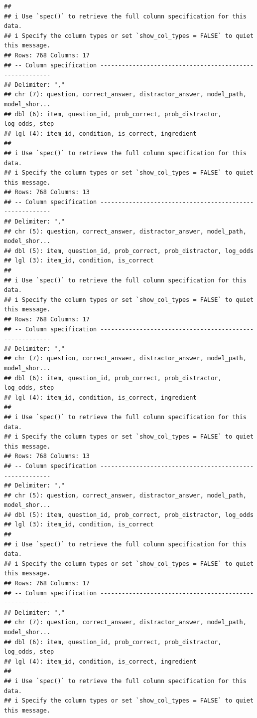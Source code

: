 \documentclass[
]{article}
\begin{document}
\begin{verbatim}
## 
## i Use `spec()` to retrieve the full column specification for this data.
## i Specify the column types or set `show_col_types = FALSE` to quiet this message.
## Rows: 768 Columns: 17
## -- Column specification --------------------------------------------------------
## Delimiter: ","
## chr (7): question, correct_answer, distractor_answer, model_path, model_shor...
## dbl (6): item, question_id, prob_correct, prob_distractor, log_odds, step
## lgl (4): item_id, condition, is_correct, ingredient
## 
## i Use `spec()` to retrieve the full column specification for this data.
## i Specify the column types or set `show_col_types = FALSE` to quiet this message.
## Rows: 768 Columns: 13
## -- Column specification --------------------------------------------------------
## Delimiter: ","
## chr (5): question, correct_answer, distractor_answer, model_path, model_shor...
## dbl (5): item, question_id, prob_correct, prob_distractor, log_odds
## lgl (3): item_id, condition, is_correct
## 
## i Use `spec()` to retrieve the full column specification for this data.
## i Specify the column types or set `show_col_types = FALSE` to quiet this message.
## Rows: 768 Columns: 17
## -- Column specification --------------------------------------------------------
## Delimiter: ","
## chr (7): question, correct_answer, distractor_answer, model_path, model_shor...
## dbl (6): item, question_id, prob_correct, prob_distractor, log_odds, step
## lgl (4): item_id, condition, is_correct, ingredient
## 
## i Use `spec()` to retrieve the full column specification for this data.
## i Specify the column types or set `show_col_types = FALSE` to quiet this message.
## Rows: 768 Columns: 13
## -- Column specification --------------------------------------------------------
## Delimiter: ","
## chr (5): question, correct_answer, distractor_answer, model_path, model_shor...
## dbl (5): item, question_id, prob_correct, prob_distractor, log_odds
## lgl (3): item_id, condition, is_correct
## 
## i Use `spec()` to retrieve the full column specification for this data.
## i Specify the column types or set `show_col_types = FALSE` to quiet this message.
## Rows: 768 Columns: 17
## -- Column specification --------------------------------------------------------
## Delimiter: ","
## chr (7): question, correct_answer, distractor_answer, model_path, model_shor...
## dbl (6): item, question_id, prob_correct, prob_distractor, log_odds, step
## lgl (4): item_id, condition, is_correct, ingredient
## 
## i Use `spec()` to retrieve the full column specification for this data.
## i Specify the column types or set `show_col_types = FALSE` to quiet this message.

\end{verbatim}
\end{document}
